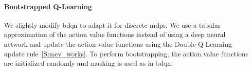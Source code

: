 \paragraph{Bootstrapped Q-Learning} We slightly modify \gls{bdqn} to adapt it for discrete \glspl{mdp}. We use a tabular approximation of the action value functions instead of using a deep neural network and update the action value functions using the Double Q-Learning update rule~\ref{S:mev_works}. To perform bootstrapping, the action value functions are initialized randomly and masking is used as in \gls{bdqn}.

\begin{figure}[t]
\begin{minipage}{.66\textwidth}
\begin{center}
\end{center}
\end{minipage}
\begin{minipage}{.33\textwidth}
\begin{center}

\end{center}
\end{minipage}
\end{figure}
